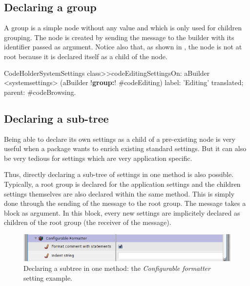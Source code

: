 \documentclass[a4paper,10pt,twoside]{book}
\begin{document}
\subsection{Declaring a group}

A group is a simple node without any value and which is only used for children grouping.
The  node is created by sending the  message to the builder with its identifier passed as argument.  Notice also that, as shown in , the  node is not at root because it is declared itself as a child of the  node.


\begin{code}{}
CodeHolderSystemSettings class>>codeEditingSettingsOn: aBuilder
	<systemsettings>
	(aBuilder !\textbf{group:}! #codeEditing) 
		label: 'Editing' translated;
		parent: #codeBrowsing.
\end{code}


\subsection{Declaring a sub-tree}
Being able to declare its own settings as a child of a pre-existing node is very useful when a package wants to enrich existing standard settings. But it can also be very tedious for settings which are very application specific. 

Thus, directly declaring a sub-tree of settings in one method is also possible. Typically, a root group is declared for the application settings and the children settings themselves are also declared within the same method. This is simply done through the sending of the  message to the root group. The  message takes a block as argument. In this block, every new settings are implicitely declared as children of the root group (the receiver of the  message). 

\begin{figure}[tbh]
\begin{center}
\includegraphics[scale=0.47]{configurableFormatter}
\caption{Declaring a subtree in one method: the \textit{Configurable formatter} setting example.}
\end{center}
\end{figure}
\end{document}
